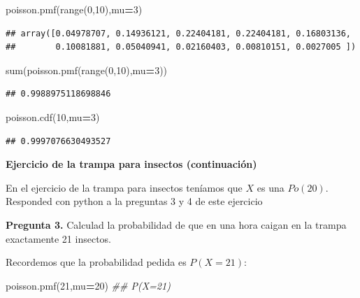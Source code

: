 \documentclass[]{book}
\newenvironment{Shaded}{\begin{snugshade}}{\end{snugshade}}
\newcommand{\BuiltInTok}[1]{#1}
\newcommand{\CommentTok}[1]{\textcolor[rgb]{0.56,0.35,0.01}{\textit{#1}}}
\newcommand{\DecValTok}[1]{\textcolor[rgb]{0.00,0.00,0.81}{#1}}
\newcommand{\NormalTok}[1]{#1}
\newcommand{\OperatorTok}[1]{\textcolor[rgb]{0.81,0.36,0.00}{\textbf{#1}}}
\begin{document}
\begin{Shaded}
\begin{Highlighting}[]
\NormalTok{poisson.pmf(}\BuiltInTok{range}\NormalTok{(}\DecValTok{0}\NormalTok{,}\DecValTok{10}\NormalTok{),mu}\OperatorTok{=}\DecValTok{3}\NormalTok{)}
\end{Highlighting}
\end{Shaded}

\begin{verbatim}
## array([0.04978707, 0.14936121, 0.22404181, 0.22404181, 0.16803136,
##        0.10081881, 0.05040941, 0.02160403, 0.00810151, 0.0027005 ])
\end{verbatim}

\begin{Shaded}
\begin{Highlighting}[]
\BuiltInTok{sum}\NormalTok{(poisson.pmf(}\BuiltInTok{range}\NormalTok{(}\DecValTok{0}\NormalTok{,}\DecValTok{10}\NormalTok{),mu}\OperatorTok{=}\DecValTok{3}\NormalTok{))}
\end{Highlighting}
\end{Shaded}

\begin{verbatim}
## 0.9988975118698846
\end{verbatim}

\begin{Shaded}
\begin{Highlighting}[]
\NormalTok{poisson.cdf(}\DecValTok{10}\NormalTok{,mu}\OperatorTok{=}\DecValTok{3}\NormalTok{)}
\end{Highlighting}
\end{Shaded}

\begin{verbatim}
## 0.9997076630493527
\end{verbatim}

\textbf{Ejercicio de la trampa para insectos (continuación)}

En el ejercicio de la trampa para insectos teníamos que \(X\) es una \(Po(20)\). Responded con python a la preguntas 3 y 4 de este ejercicio

\textbf{Pregunta 3.} Calculad la probabilidad de que en una hora caigan en la trampa exactamente 21 insectos.

Recordemos que la probabilidad pedida es \(P(X=21)\):

\begin{Shaded}
\begin{Highlighting}[]
\NormalTok{poisson.pmf(}\DecValTok{21}\NormalTok{,mu}\OperatorTok{=}\DecValTok{20}\NormalTok{)}
\CommentTok{## P(X=21)}
\end{Highlighting}
\end{Shaded}
\end{document}
